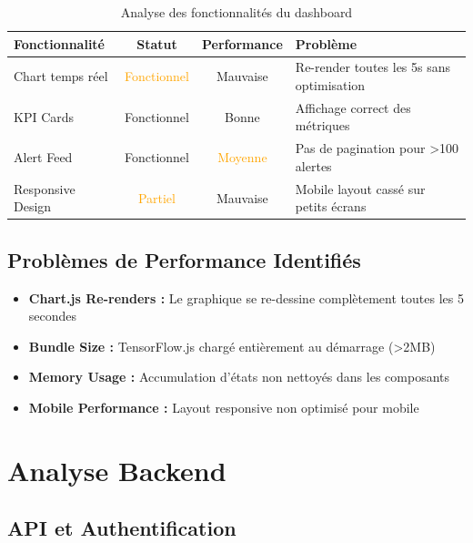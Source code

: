 \documentclass[a4paper,12pt]{article}
\begin{document}
\begin{table}[h]
\centering
\begin{tabular}{|l|c|c|p{4cm}|}
\hline
\textbf{Fonctionnalité} & \textbf{Statut} & \textbf{Performance} & \textbf{Problème} \\
\hline
Chart temps réel & \textcolor{orange}{Fonctionnel} & \textcolor{alertred}{Mauvaise} & Re-render toutes les 5s sans optimisation \\
\hline
KPI Cards & \textcolor{accentgreen}{Fonctionnel} & \textcolor{accentgreen}{Bonne} & Affichage correct des métriques \\
\hline
Alert Feed & \textcolor{accentgreen}{Fonctionnel} & \textcolor{orange}{Moyenne} & Pas de pagination pour >100 alertes \\
\hline
Responsive Design & \textcolor{orange}{Partiel} & \textcolor{alertred}{Mauvaise} & Mobile layout cassé sur petits écrans \\
\hline
\end{tabular}
\caption{Analyse des fonctionnalités du dashboard}
\end{table}

\subsection{Problèmes de Performance Identifiés}

\begin{itemize}
    \item \textbf{Chart.js Re-renders :} Le graphique se re-dessine complètement toutes les 5 secondes
    \item \textbf{Bundle Size :} TensorFlow.js chargé entièrement au démarrage (>2MB)
    \item \textbf{Memory Usage :} Accumulation d'états non nettoyés dans les composants
    \item \textbf{Mobile Performance :} Layout responsive non optimisé pour mobile
\end{itemize}

\section{Analyse Backend}

\subsection{API et Authentification}
\end{document}
